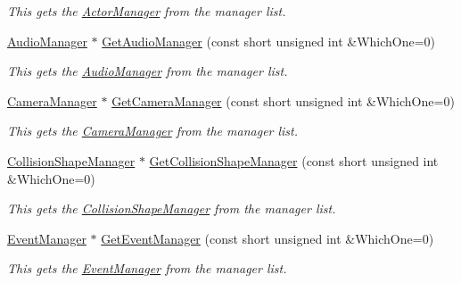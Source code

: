 \begin{DoxyCompactItemize}
\begin{DoxyCompactList}\small\item\em This gets the \hyperlink{classMezzanine_1_1ActorManager}{ActorManager} from the manager list. \item\end{DoxyCompactList}\item 
\hyperlink{classMezzanine_1_1AudioManager}{AudioManager} $\ast$ \hyperlink{classMezzanine_1_1World_a5eacbc4dadfbed87bcf09d2840572cca}{GetAudioManager} (const short unsigned int \&WhichOne=0)
\begin{DoxyCompactList}\small\item\em This gets the \hyperlink{classMezzanine_1_1AudioManager}{AudioManager} from the manager list. \item\end{DoxyCompactList}\item 
\hyperlink{classMezzanine_1_1CameraManager}{CameraManager} $\ast$ \hyperlink{classMezzanine_1_1World_a5fb7e735bf7f64060cf2479ebf70f467}{GetCameraManager} (const short unsigned int \&WhichOne=0)
\begin{DoxyCompactList}\small\item\em This gets the \hyperlink{classMezzanine_1_1CameraManager}{CameraManager} from the manager list. \item\end{DoxyCompactList}\item 
\hyperlink{classMezzanine_1_1CollisionShapeManager}{CollisionShapeManager} $\ast$ \hyperlink{classMezzanine_1_1World_a0062fc5934ff6d0824a7c794d52bc888}{GetCollisionShapeManager} (const short unsigned int \&WhichOne=0)
\begin{DoxyCompactList}\small\item\em This gets the \hyperlink{classMezzanine_1_1CollisionShapeManager}{CollisionShapeManager} from the manager list. \item\end{DoxyCompactList}\item 
\hyperlink{classMezzanine_1_1EventManager}{EventManager} $\ast$ \hyperlink{classMezzanine_1_1World_a9e1c735cae7ec2df827d5b1616483bad}{GetEventManager} (const short unsigned int \&WhichOne=0)
\begin{DoxyCompactList}\small\item\em This gets the \hyperlink{classMezzanine_1_1EventManager}{EventManager} from the manager list. \item\end{DoxyCompactList}\item 

\end{DoxyCompactItemize}
